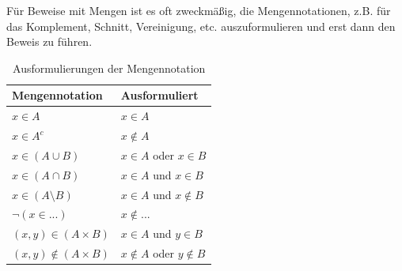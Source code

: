 \documentclass{article}
\begin{document}
Für Beweise mit Mengen ist es oft zweckmäßig, die Mengennotationen, z.B. für das Komplement, Schnitt, Vereinigung, etc. auszuformulieren und erst dann den Beweis zu führen.
\begin{table}[h]
	\centering
	\caption{Ausformulierungen der Mengennotation}
	\begin{tabular}{l|l}
		\hline\hline
			Mengennotation & Ausformuliert\\
		\hline
			$x\in A$ & $x\in A$\\
		\hline
			$x\in A^c$ & $x\notin A$\\
		\hline
			$x\in (A\cup B)$ & $x\in A$ oder $x\in B$\\
		\hline
			$x\in (A\cap B)$ & $x\in A$ und $x\in B$\\
		\hline
			$x\in (A\setminus B)$ & $x\in A$ und $x\notin B$\\
		\hline
			$\neg (x\in ...)$ & $x\notin ...$\\
		\hline
			$(x,y)\in (A\times B)$ & $x\in A$ und $y\in B$\\
		\hline
			$(x,y) \notin (A \times B)$ & $x\notin A$ oder $y\notin B$ \\
		\hline\hline
	\end{tabular}
\end{table}


\newpage
\end{document}
